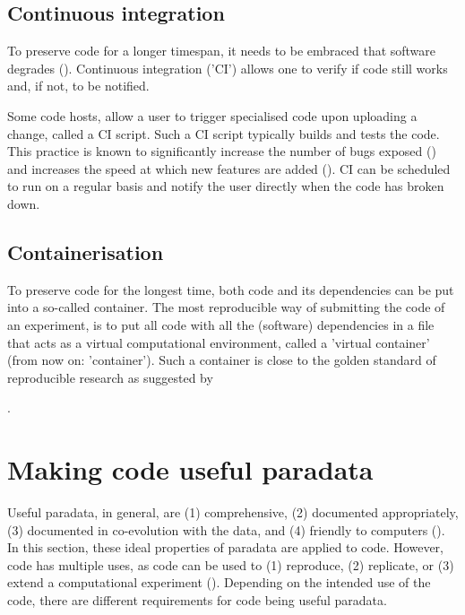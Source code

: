 \subsection{Continuous integration}

To preserve code for a longer timespan, 
it needs to be embraced that software degrades (\cite{beck2000extreme}).
Continuous integration ('CI') allows one to 
verify if code still works and, if not, to be notified.


Some code hosts,
allow a user to trigger specialised code upon uploading a change,
called a CI script.
Such a CI script typically builds and tests the code.
This practice is known to significantly 
increase the number of bugs exposed (\cite{vasilescu2015}) and increases
the speed at which new features are added (\cite{vasilescu2015}).
CI can be scheduled to run on a regular basis and
notify the user directly when the code has broken down.

\subsection{Containerisation}

To preserve code for the longest time, 
both code and its dependencies can be put into a so-called container.
The most reproducible way of submitting the code of an experiment,
is to put all code with all the (software) dependencies
in a file that acts as a virtual computational environment,
called a 'virtual container' (from now on: 'container').
Such a container is close to the golden standard of reproducible research
as suggested by 
\cite{peng2011reproducible} 

.

\section{Making code useful paradata}\label{sec:making-code-useful-paradata}

Useful paradata, in general, are (1) comprehensive,
(2) documented appropriately, (3) documented in co-evolution with the data,
and (4) friendly to computers (\cite{huvila2022improving}).
In this section, these ideal properties of paradata are applied to code.
However, code has multiple uses,
as code can be used to (1) reproduce, (2) replicate, or (3)
extend a computational experiment (\cite{benureau2018re}).
Depending on the intended use of the code,
there are different requirements for code being useful paradata.

